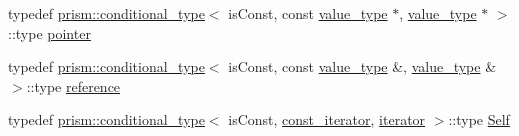 \begin{DoxyCompactItemize}
\item 
typedef \hyperlink{structprism_1_1conditional__type}{prism\+::conditional\+\_\+type}$<$ is\+Const, const \hyperlink{structprism_1_1_associative_iterator_a9708a3c0f7299fcdb2c668a3366b304a}{value\+\_\+type} $\ast$, \hyperlink{structprism_1_1_associative_iterator_a9708a3c0f7299fcdb2c668a3366b304a}{value\+\_\+type} $\ast$ $>$\+::type \hyperlink{structprism_1_1_associative_iterator_a50b40598e0da0364f809450010172dd2}{pointer}
\item 
typedef \hyperlink{structprism_1_1conditional__type}{prism\+::conditional\+\_\+type}$<$ is\+Const, const \hyperlink{structprism_1_1_associative_iterator_a9708a3c0f7299fcdb2c668a3366b304a}{value\+\_\+type} \&, \hyperlink{structprism_1_1_associative_iterator_a9708a3c0f7299fcdb2c668a3366b304a}{value\+\_\+type} \& $>$\+::type \hyperlink{structprism_1_1_associative_iterator_a3e7953b18f39af18e7cac9b95c9709e7}{reference}
\item 
typedef \hyperlink{structprism_1_1conditional__type}{prism\+::conditional\+\_\+type}$<$ is\+Const, \hyperlink{structprism_1_1_associative_iterator_ab372de0dedeecc03d00f577af3380ef2}{const\+\_\+iterator}, \hyperlink{structprism_1_1_associative_iterator_a1c18ef8b4a02324bfdbf541b023ecc6b}{iterator} $>$\+::type \hyperlink{structprism_1_1_associative_iterator_acec023aedf7a8097250179b1de84d78d}{Self}
\end{DoxyCompactItemize}
